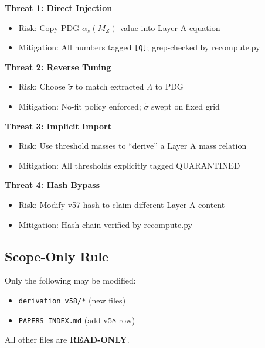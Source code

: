 \documentclass[11pt,a4paper]{article}
\theoremstyle{definition}
\begin{document}
\begin{threatbox}
\textbf{Threat 1: Direct Injection}
\begin{itemize}
  \item Risk: Copy PDG $\alpha_s(M_Z)$ value into Layer A equation
  \item Mitigation: All numbers tagged \texttt{[Q]}; grep-checked by recompute.py
\end{itemize}

\textbf{Threat 2: Reverse Tuning}
\begin{itemize}
  \item Risk: Choose $\tilde{\sigma}$ to match extracted $\Lambda$ to PDG
  \item Mitigation: No-fit policy enforced; $\tilde{\sigma}$ swept on fixed grid
\end{itemize}

\textbf{Threat 3: Implicit Import}
\begin{itemize}
  \item Risk: Use threshold masses to ``derive'' a Layer A mass relation
  \item Mitigation: All thresholds explicitly tagged QUARANTINED
\end{itemize}

\textbf{Threat 4: Hash Bypass}
\begin{itemize}
  \item Risk: Modify v57 hash to claim different Layer A content
  \item Mitigation: Hash chain verified by recompute.py
\end{itemize}
\end{threatbox}

\subsection{Scope-Only Rule}
\label{subsec:scope-only}

\begin{trapbox}[HR-P62-SCOPE]
Only the following may be modified:
\begin{itemize}
  \item \texttt{derivation\_v58/*} (new files)
  \item \texttt{PAPERS\_INDEX.md} (add v58 row)
\end{itemize}
All other files are \textbf{READ-ONLY}.
\end{trapbox}

\end{document}

